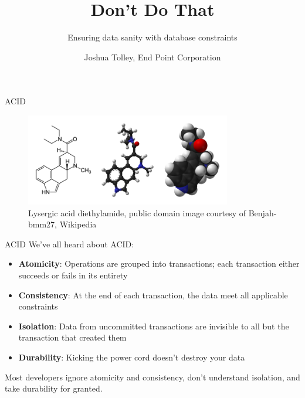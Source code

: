 \documentclass{beamer}
\begin{document}
\title{Don't Do That}
\subtitle{Ensuring data sanity with database constraints}
\author{Joshua Tolley, End Point Corporation}

\frame{\titlepage}


\begin{frame}{ACID}
    \begin{figure}[t]
        \includegraphics[width=0.8\textwidth]{lsd.png}
        \caption{Lysergic acid diethylamide, public domain image courtesy of Benjah-bmm27, Wikipedia}
    \end{figure}
\end{frame}

\begin{frame}{ACID}
    We've all heard about ACID:
    \begin{itemize}
        \item {\bf \color{red}Atomicity}: Operations are grouped into transactions; each transaction either succeeds or fails in its entirety
        \item {\bf \color{red}Consistency}: At the end of each transaction, the data meet all applicable constraints
        \item {\bf \color{red}Isolation}: Data from uncommitted transactions are invisible to all but the transaction that created them
        \item {\bf \color{red}Durability}: Kicking the power cord doesn't destroy your data
    \end{itemize}
    Most developers ignore atomicity and consistency, don't understand isolation, and take durability for granted.
\end{frame}
\end{document}

